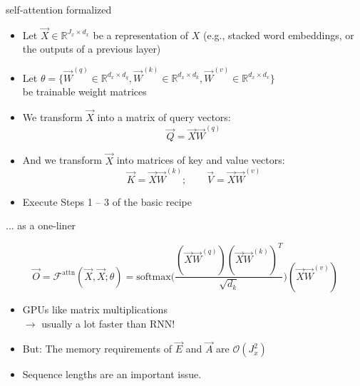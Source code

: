 \documentclass[11pt,compress,t,notes=noshow, xcolor=table]{beamer}
\begin{document}

\begin{frame}{self-attention formalized}

\vfill

\begin{itemize}
\item Let $\vec X \in \mathbb{R}^{J_x \times d_x}$ be a representation of $X$ (e.g., stacked word embeddings, or the outputs of a previous layer)
\item Let $\theta = \{\vec W^{(q)} \in \mathbb{R}^{d_x \times d_q}, \vec W^{(k)} \in \mathbb{R}^{d_x \times d_k}, \vec W^{(v)} \in \mathbb{R}^{d_x \times d_v}\}$\\ be trainable weight matrices
\item We transform $\vec X$ into a matrix of query vectors:
$$ \vec Q = \vec X \vec W^{(q)} $$
\item And we transform $\vec X$ into matrices of key and value vectors:
$$ \vec K = \vec X \vec W^{(k)} ; \qquad \vec V =  \vec X \vec W^{(v)}$$
\item Execute Steps 1 -- 3 of the basic recipe 
\end{itemize}

\vfill

\end{frame}


\begin{frame}{... as a one-liner}

\vfill

\large
$$ \vec O = \mathcal{F}^\mathrm{attn}(\vec X, \vec X; \theta) = \mathrm{softmax}\Big(\frac{(\vec X\vec W^{(q)} ) (\vec X\vec W^{(k)} )^T}{\sqrt{d_k}}\Big)(\vec X\vec W^{(v)} ) $$
\begin{itemize}
\item GPUs like matrix multiplications\\$\rightarrow$ usually a lot faster than RNN!
\item But: The memory requirements of $\vec E$ and $\vec A$ are $\mathcal{O}(J_x^2)$
\item Sequence lengths are an important issue.
\end{itemize}

\vfill

\end{frame}

\end{document}
